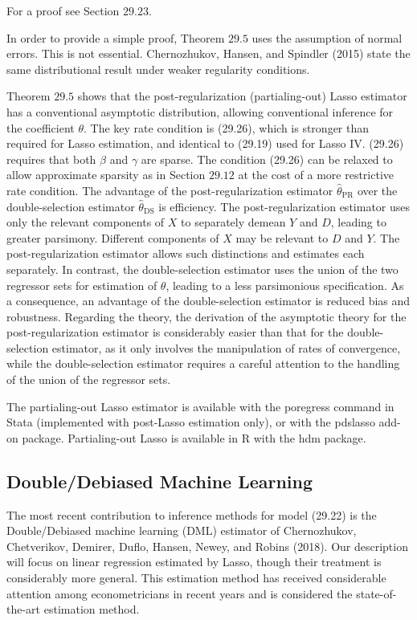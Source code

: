 \documentclass[10pt]{article}
\begin{document}
For a proof see Section $29.23$.

In order to provide a simple proof, Theorem $29.5$ uses the assumption of normal errors. This is not essential. Chernozhukov, Hansen, and Spindler (2015) state the same distributional result under weaker regularity conditions.

Theorem $29.5$ shows that the post-regularization (partialing-out) Lasso estimator has a conventional asymptotic distribution, allowing conventional inference for the coefficient $\theta$. The key rate condition is (29.26), which is stronger than required for Lasso estimation, and identical to (29.19) used for Lasso IV. (29.26) requires that both $\beta$ and $\gamma$ are sparse. The condition (29.26) can be relaxed to allow approximate sparsity as in Section $29.12$ at the cost of a more restrictive rate condition. The advantage of the post-regularization estimator $\widehat{\theta}_{\mathrm{PR}}$ over the double-selection estimator $\widehat{\theta}_{\mathrm{DS}}$ is efficiency. The post-regularization estimator uses only the relevant components of $X$ to separately demean $Y$ and $D$, leading to greater parsimony. Different components of $X$ may be relevant to $D$ and $Y$. The post-regularization estimator allows such distinctions and estimates each separately. In contrast, the double-selection estimator uses the union of the two regressor sets for estimation of $\theta$, leading to a less parsimonious specification. As a consequence, an advantage of the double-selection estimator is reduced bias and robustness. Regarding the theory, the derivation of the asymptotic theory for the post-regularization estimator is considerably easier than that for the double-selection estimator, as it only involves the manipulation of rates of convergence, while the double-selection estimator requires a careful attention to the handling of the union of the regressor sets.

The partialing-out Lasso estimator is available with the poregress command in Stata (implemented with post-Lasso estimation only), or with the pdslasso add-on package. Partialing-out Lasso is available in $\mathrm{R}$ with the hdm package.

\subsection{Double/Debiased Machine Learning}
The most recent contribution to inference methods for model (29.22) is the Double/Debiased machine learning (DML) estimator of Chernozhukov, Chetverikov, Demirer, Duflo, Hansen, Newey, and Robins (2018). Our description will focus on linear regression estimated by Lasso, though their treatment is considerably more general. This estimation method has received considerable attention among econometricians in recent years and is considered the state-of-the-art estimation method.
\end{document}
